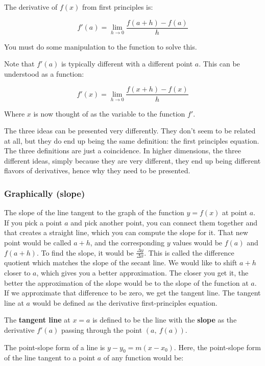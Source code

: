 \documentclass[12pt]{article}
\theoremstyle{plain}
\theoremstyle{remark}
\theoremstyle{definition}
\begin{document}
The derivative of \(f(x)\) from first principles is:

\[f'(a) = \lim_{h \rightarrow 0}\frac{f(a + h) - f(a)}{h}\]

You must do some manipulation to the function to solve this.

Note that \(f'(a)\) is typically different with a different point \(a\).
This can be understood as a function:

\[f'(x) = \lim_{h \rightarrow 0}\frac{f(x + h) - f(x)}{h}\]

Where \(x\) is now thought of as the variable to the function \(f'\).

The three ideas can be presented very differently. They don't seem to be
related at all, but they do end up being the same definition: the first
principles equation. The three definitions are just a coincidence. In
higher dimensions, the three different ideas, simply because they are
very different, they end up being different flavors of derivatives,
hence why they need to be presented.


\subsubsection{Graphically (slope)}

The slope of the line tangent to the graph of the function \(y = f(x)\)
at point \(a\). If you pick a point \(a\) and pick another point, you
can connect them together and that creates a straight line, which you
can compute the slope for it. That new point would be called \(a + h\),
and the corresponding \(y\) values would be \(f(a)\) and \(f(a + h)\).
To find the slope, it would be \(\frac{\Delta y}{\Delta x}\). This is
called the difference quotient which matches the slope of the secant
line. We would like to shift \(a + h\) closer to \(a\), which gives you
a better approximation. The closer you get it, the better the
approximation of the slope would be to the slope of the function at
\(a\). If we approximate that difference to be zero, we get the tangent
line. The tangent line at \(a\) would be defined as the derivative
first-principles equation.

The \textbf{tangent line} at \(x = a\) is defined to be the line with
the \textbf{slope} as the derivative \(f'(a)\) passing through the point
\(\left( a,\ f(a) \right)\).

The point-slope form of a line is
\(y - y_{0} = m\left( x - x_{0} \right)\). Here, the point-slope form of
the line tangent to a point \(a\) of any function would be:
\end{document}
